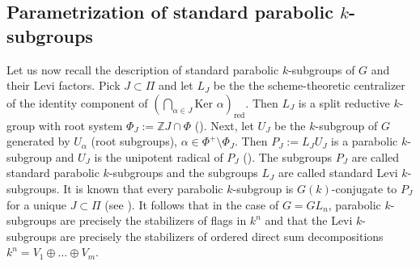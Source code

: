 \documentclass{amsart}
\theoremstyle{plain}
\theoremstyle{definition}
\theoremstyle{remark}
\begin{document}
\subsection{Parametrization of standard parabolic $k$-subgroups}\label{parabolic subgroups}
Let us now recall the  description of standard parabolic $k$-subgroups of $G$ and their Levi factors. Pick $J\subset\Pi$ and 
let $L_J$ be the the scheme-theoretic centralizer of the identity component of $(\bigcap_{\alpha\in J}\text{Ker }\alpha)_{\text{red}}$. Then $L_{J}$ is a split reductive $k$-group with root system $\Phi_{J}:=\mathbb{Z}J\cap\Phi$ (\cite[Proposition 21.90]{Mil1}). Next, let $U_{J}$ be the $k$-subgroup of $G$ generated by $U_{\alpha}$ (root subgroups), $\alpha\in\Phi^{+}\setminus\Phi_{J}$. Then $P_{J} := L_{J}U_{J}$ is a parabolic $k$-subgroup and $U_{J}$ is the unipotent radical of $P_{J}$ (\cite[Theorem 21.91]{Mil1}). The subgroups $P_{J}$ are called standard parabolic $k$-subgroups and the subgroups $L_{J}$ are called standard Levi $k$-subgroups.
It is known that every parabolic $k$-subgroup is $G(k)$-conjugate to $P_J$ for a unique $J\subset\Pi$ (see \cite[Theorem 21.91 and Theorem 25.8]{Mil1}). It follows that in the case of $G=GL_n$, parabolic $k$-subgroups are precisely the stabilizers of flags in $k^{n}$ and that the Levi $k$-subgroups are precisely the stabilizers of
ordered direct sum decompositions $k^{n}=V_{1}\oplus\ldots\oplus V_{m}$.
\end{document}
